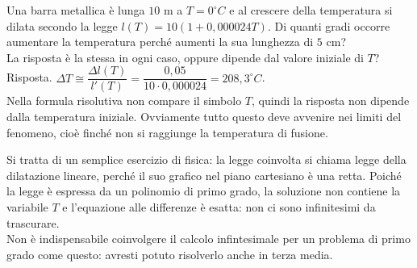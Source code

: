 \begin{esempio}
 Una barra metallica è lunga $10$ m a $T=0 ^\circ C$ e al crescere della 
 temperatura si dilata secondo la legge $l(T)=10(1+0,000024T)$. Di quanti 
gradi 
 occorre aumentare la temperatura perché aumenti la sua lunghezza di $5$ 
cm?\\
 La risposta è la stessa in ogni caso, oppure dipende dal valore iniziale 
di 
 $T$?\\
 Risposta. $\Delta T\cong \dfrac{\Delta l(T)}{l'(T)}=\dfrac{0,05}
 {10\cdot 0,000024}=208,3 ^\circ C$.\\
 Nella formula risolutiva non compare il simbolo $T$, quindi la risposta 
non 
 dipende dalla temperatura iniziale. Ovviamente tutto questo deve avvenire 
nei 
 limiti del fenomeno, cioè finché non si raggiunge la temperatura di 
fusione.
 \begin{osservazione}
  Si tratta di un semplice esercizio di fisica: la legge coinvolta si chiama
  legge della dilatazione lineare, perché il suo grafico nel piano 
cartesiano 
  è una retta. Poiché la legge è espressa da un polinomio di primo grado, 
la 
  soluzione non contiene la variabile $T$ e l'equazione alle differenze è
  esatta: non ci sono infinitesimi da trascurare.\\
  Non è indispensabile coinvolgere il calcolo infintesimale per un problema 
di
  primo grado come questo: avresti potuto risolverlo anche in terza media.
 \end{osservazione}

\end{esempio}
